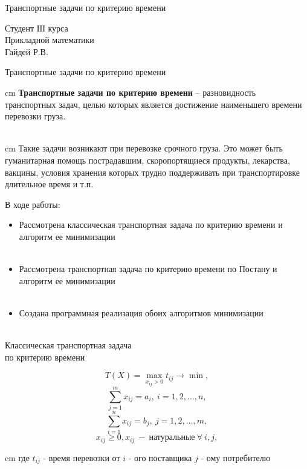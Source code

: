 \documentclass[serif,10pt,utf8, russian]{beamer}
\begin{document}
\begin{frame}
\begin{block}{\begin{center}Транспортные задачи по критерию времени\end{center}}
\begin{center}
Студент ІІІ курса\\
Прикладной математики\\
Гайдей Р.В.
\end{center}
\end{block}
\end{frame}

\begin{frame}{\begin{center}Транспортные задачи по критерию времени\end{center}}
\parbox{11 cm}{ cm \textbf{Транспортные задачи по критерию времени} – разновидность транспортных задач, целью которых является достижение наименьшего времени перевозки груза.\\ \ \\}
\pause
\parbox{11 cm}{ cm Такие задачи возникают при перевозке срочного груза. Это может быть гуманитарная помощь пострадавшим, скоропортящиеся продукты, лекарства, вакцины, условия хранения которых трудно поддерживать при транспортировке длительное время и т.п.}
\end{frame}

\begin{frame}{\begin{center}В ходе работы:\end{center}}
\pause
\begin{itemize}
\item Рассмотрена классическая транспортная задача по критерию времени и алгоритм ее минимизации\\ \ \\
\pause
\item Рассмотрена транспортная задача по критерию времени по Постану и алгоритм ее минимизации\\ \ \\
\pause
\item Создана программная реализация обоих алгоритмов минимизации\\ \ \\
\end{itemize}
\end{frame}

\begin{frame}{\begin{center}Классическая транспортная задача \\по критерию времени\end{center}}
$$T\left(X\right) = \max_{x_{ij}>0}{t_{ij}} \rightarrow \min,$$
\pause
$$\sum_{j=1}^{m}{x_{ij}}=a_{i},\ i=1,2,\dots,n,$$
$$\sum_{i=1}^{n}{x_{ij}}=b_{j},\ j=1,2,\dots,m,$$
\pause
$$x_{ij}\ge 0, x_{ij}\ -\ \text{натуральные}\ \forall\ i,j,$$
\pause
\parbox{11 cm}{ cm где $t_{ij}$ - время перевозки от $i$ - ого поставщика $j$ - ому потребителю}
\end{frame}
\end{document}
